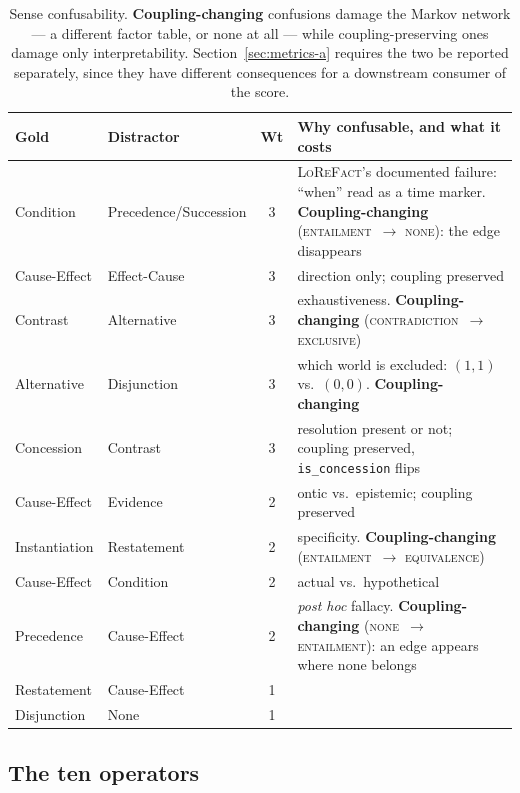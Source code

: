 \documentclass[11pt]{article}
\newcommand{\cEnt}{\textsc{entailment}}
\newcommand{\cCon}{\textsc{contradiction}}
\newcommand{\cEqv}{\textsc{equivalence}}
\newcommand{\cExc}{\textsc{exclusive}}
\newcommand{\cNone}{\textsc{none}}
\begin{document}
\begin{table}[h]\centering\small
\renewcommand{\arraystretch}{1.1}
\begin{tabular}{@{}llcp{7.1cm}@{}}
\toprule
\textbf{Gold} & \textbf{Distractor} & \textbf{Wt} & \textbf{Why confusable, and what it costs}\\
\midrule
Condition     & Precedence/Succession & 3 & \textsc{LoReFact}'s documented failure: ``when''
  read as a time marker. \textbf{Coupling-changing} (\cEnt\ $\rightarrow$ \cNone): the edge
  disappears\\
Cause-Effect  & Effect-Cause & 3 & direction only; coupling preserved\\
Contrast      & Alternative  & 3 & exhaustiveness. \textbf{Coupling-changing}
  (\cCon\ $\rightarrow$ \cExc)\\
Alternative   & Disjunction  & 3 & which world is excluded: $(1,1)$ vs.\ $(0,0)$.
  \textbf{Coupling-changing}\\
Concession    & Contrast     & 3 & resolution present or not; coupling preserved,
  \texttt{is\_concession} flips\\
Cause-Effect  & Evidence     & 2 & ontic vs.\ epistemic; coupling preserved\\
Instantiation & Restatement  & 2 & specificity. \textbf{Coupling-changing}
  (\cEnt\ $\rightarrow$ \cEqv)\\
Cause-Effect  & Condition    & 2 & actual vs.\ hypothetical\\
Precedence    & Cause-Effect & 2 & \emph{post hoc} fallacy. \textbf{Coupling-changing}
  (\cNone\ $\rightarrow$ \cEnt): an edge appears where none belongs\\
Restatement   & Cause-Effect & 1 & \\
Disjunction   & None         & 1 & \\
\bottomrule
\end{tabular}
\caption{Sense confusability. \textbf{Coupling-changing} confusions damage the Markov network
--- a different factor table, or none at all --- while coupling-preserving ones damage only
interpretability. Section~\ref{sec:metrics-a} requires the two be reported separately, since
they have different consequences for a downstream consumer of the score.}
\label{tab:confuse}
\end{table}

\subsection{The ten operators}
\label{sec:operators}
\end{document}
